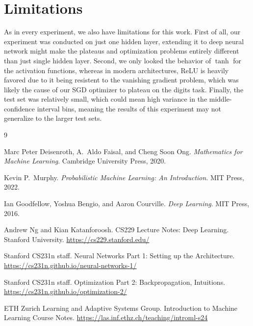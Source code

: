 \documentclass[11pt]{article}
\begin{document}
\section{Limitations}

As in every experiment, we also have limitations for this work. First of all, our experiment was conducted on just one hidden layer, extending it to deep neural network might make the plateaus and optimization problems entirely different than just single hidden layer. Second, we only looked the behavior of $\tanh$ for the activation functions, whereas in modern architectures, ReLU is heavily favored due to it being resistent to the vanishing gradient problem, which was likely the cause of our SGD optimizer to plateau on the digits task. Finally, the test set was relatively small, which could mean high variance in the middle-confidence interval bins, meaning the results of this experiment may not generalize to the larger test sets.

\begin{thebibliography}{9}

Marc Peter Deisenroth, A.\ Aldo Faisal, and Cheng Soon Ong.
\textit{Mathematics for Machine Learning}.
Cambridge University Press, 2020.

Kevin P.\ Murphy.
\textit{Probabilistic Machine Learning: An Introduction}.
MIT Press, 2022.

Ian Goodfellow, Yoshua Bengio, and Aaron Courville.
\textit{Deep Learning}.
MIT Press, 2016.

Andrew Ng and Kian Katanforoosh.
CS229 Lecture Notes: Deep Learning.
Stanford University.
\url{https://cs229.stanford.edu/}

Stanford CS231n staff.
Neural Networks Part 1: Setting up the Architecture.
\url{https://cs231n.github.io/neural-networks-1/}

Stanford CS231n staff.
Optimization Part 2: Backpropagation, Intuitions.
\url{https://cs231n.github.io/optimization-2/}

ETH Zurich Learning and Adaptive Systems Group.
Introduction to Machine Learning Course Notes.
\url{https://las.inf.ethz.ch/teaching/introml-s24}

\end{thebibliography}
\end{document}

